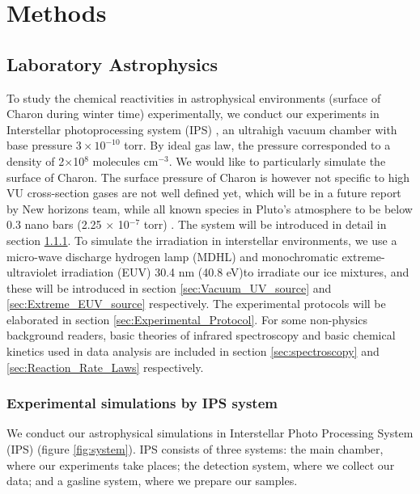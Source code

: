 \chapter{\protect Methods}
\label{methods}

\section{Laboratory Astrophysics}
To study the chemical reactivities in astrophysical environments (surface of Charon during winter time) experimentally,
we conduct our experiments in Interstellar photoprocessing system (IPS) \cite{chen2013vacuum},
an ultrahigh vacuum chamber with base pressure $3 \times 10^{-10}$ torr. By ideal gas law, the pressure corresponded to a density of 2$\times$10$^8$ molecules cm$^{-3}$. We would like to particularly simulate the surface of Charon. The surface pressure of Charon is however not specific to high VU cross-section gases are not well defined yet, which will be in a future report by New horizons team, while all known species in Pluto's atmosphere to be below 0.3 nano bars (2.25 $\times$ 10$^{-7}$ torr) \cite{stern2017new}.
The system will be introduced in detail in section \ref{sec:IPS_system}.
To simulate the irradiation in interstellar environments,
we use a micro-wave discharge hydrogen lamp (MDHL) and monochromatic extreme-ultraviolet irradiation (EUV) 30.4 nm (40.8 eV)to irradiate our ice mixtures,
and these will be introduced in section \ref{sec:Vacuum_UV_source} and \ref{sec:Extreme_EUV_source} respectively.
The experimental protocols will be elaborated in section \ref{sec:Experimental_Protocol}.
For some non-physics background readers, basic theories of infrared spectroscopy and basic chemical kinetics used in data analysis are included in section \ref{sec:spectroscopy} and \ref{sec:Reaction_Rate_Laws} respectively.\\

\subsection{Experimental simulations by IPS system}
\label{sec:IPS_system}

We conduct our astrophysical simulations in Interstellar Photo Processing System (IPS) (figure \ref{fig:system}). IPS consists of three systems: the main chamber, where our experiments take places; the detection system, where we collect our data; and a gasline system, where we prepare our samples.

